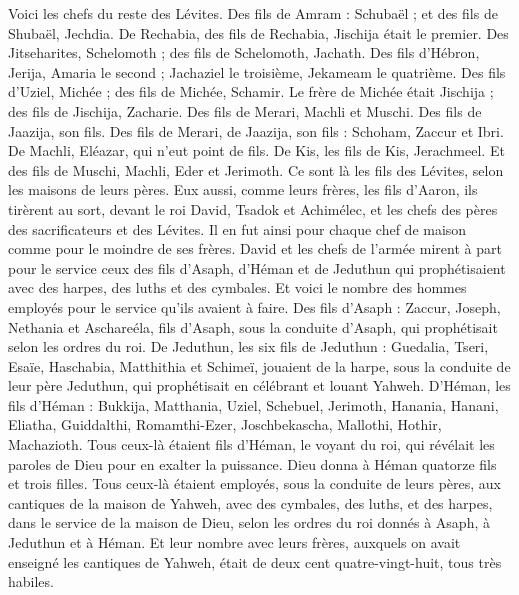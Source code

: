 \begin{multicols}{2}
Voici les chefs du reste des Lévites. Des fils de Amram : Schubaël ; et des fils de Shubaël, Jechdia.
De Rechabia, des fils de Rechabia, Jischija était le premier.
Des Jitseharites, Schelomoth ; des fils de Schelomoth, Jachath.
Des fils d’Hébron, Jerija, Amaria le second ; Jachaziel le troisième, Jekameam le quatrième.
Des fils d'Uziel, Michée ; des fils de Michée, Schamir.
Le frère de Michée était Jischija ; des fils de Jischija, Zacharie.
Des fils de Merari, Machli et Muschi. Des fils de Jaazija, son fils.
Des fils de Merari, de Jaazija, son fils : Schoham, Zaccur et Ibri.
De Machli, Eléazar, qui n'eut point de fils.
De Kis, les fils de Kis, Jerachmeel.
Et des fils de Muschi, Machli, Eder et Jerimoth. Ce sont là les fils des Lévites, selon les maisons de leurs pères.
Eux aussi, comme leurs frères, les fils d'Aaron, ils tirèrent au sort, devant le  roi David, Tsadok et Achimélec, et les chefs des pères des sacrificateurs et des Lévites. Il en fut ainsi pour chaque chef de maison comme pour le moindre de ses frères.
\VerseOne{}David et les chefs de l'armée mirent à part pour le service ceux des fils d'Asaph, d'Héman et de Jeduthun qui prophétisaient avec des harpes, des luths et des cymbales. Et voici le nombre des hommes employés pour le service qu’ils avaient à faire.
Des fils d'Asaph : Zaccur, Joseph, Nethania et Aschareéla, fils d'Asaph, sous la conduite d'Asaph, qui prophétisait selon les ordres du roi.
De Jeduthun, les six fils de Jeduthun : Guedalia, Tseri, Esaïe, Haschabia, Matthithia et Schimeï, jouaient de la harpe, sous la conduite de leur père Jeduthun, qui prophétisait en célébrant et louant Yahweh.
D'Héman, les fils d'Héman : Bukkija, Matthania, Uziel, Schebuel, Jerimoth, Hanania, Hanani, Eliatha, Guiddalthi, Romamthi-Ezer, Joschbekascha, Mallothi, Hothir, Machazioth.
Tous ceux-là étaient fils d'Héman, le voyant du roi, qui révélait les paroles de Dieu pour en exalter la puissance. Dieu donna à Héman quatorze fils et trois filles.
Tous ceux-là étaient employés, sous la conduite de leurs pères, aux cantiques de la maison de Yahweh, avec des cymbales, des luths, et des harpes, dans le service de la maison de Dieu, selon les ordres du roi donnés à Asaph, à Jeduthun et à Héman.
Et leur nombre avec leurs frères, auxquels on avait enseigné les cantiques de Yahweh, était de deux cent quatre-vingt-huit, tous très habiles.

\end{multicols}
